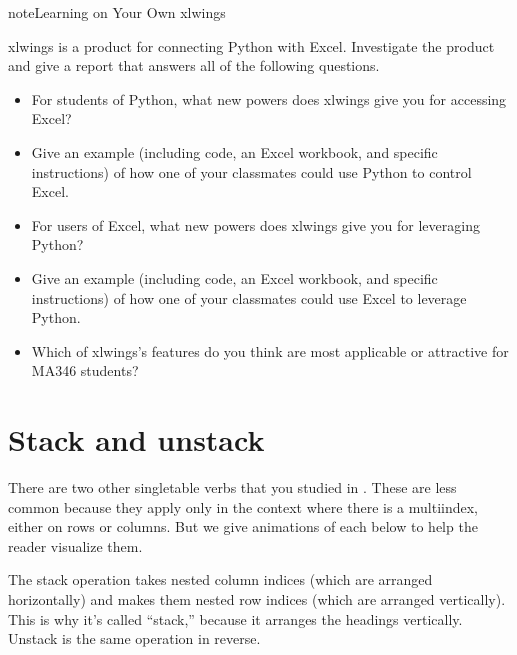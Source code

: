 \documentclass[letterpaper,10pt,english]{jupyterBook}
\begin{document}
\begin{sphinxadmonition}{note}{Learning on Your Own \sphinxhyphen{} xlwings}

\sphinxAtStartPar
xlwings is a product for connecting Python with Excel.  Investigate the product and give a report that answers all of the following questions.
\begin{itemize}
\item {} 
\sphinxAtStartPar
For students of Python, what new powers does xlwings give you for accessing Excel?

\item {} 
\sphinxAtStartPar
Give an example (including code, an Excel workbook, and specific instructions) of how one of your classmates could use Python to control Excel.

\item {} 
\sphinxAtStartPar
For users of Excel, what new powers does xlwings give you for leveraging Python?

\item {} 
\sphinxAtStartPar
Give an example (including code, an Excel workbook, and specific instructions) of how one of your classmates could use Excel to leverage Python.

\item {} 
\sphinxAtStartPar
Which of xlwings’s features do you think are most applicable or attractive for MA346 students?

\end{itemize}
\end{sphinxadmonition}


\section{Stack and unstack}
\label{\detokenize{chapter-6-single-table-verbs:stack-and-unstack}}
\sphinxAtStartPar
There are two other single\sphinxhyphen{}table verbs that you studied in .  These are less common because they apply only in the context where there is a multi\sphinxhyphen{}index, either on rows or columns.  But we give animations of each below to help the reader visualize them.

\sphinxAtStartPar
The stack operation takes nested column indices (which are arranged horizontally) and makes them nested row indices (which are arranged vertically).  This is why it’s called “stack,” because it arranges the headings vertically.  Unstack is the same operation in reverse.
\end{document}
